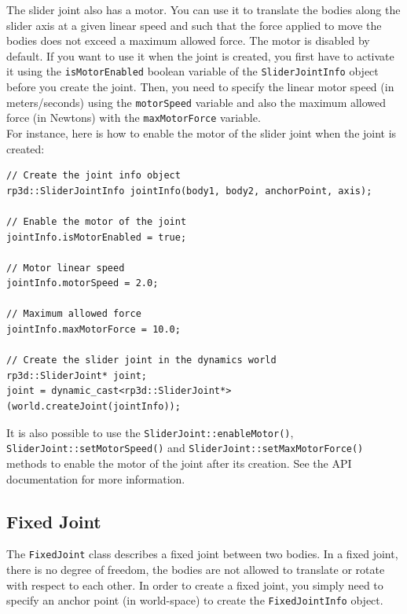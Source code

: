 \documentclass[a4paper,12pt]{article}
\begin{document}
     The slider joint also has a motor. You can use it to translate the bodies along the slider axis at a given linear speed and such that the force applied to
     move the bodies does not exceed a maximum allowed force. The motor is disabled by default. If you want to use it when the joint is created, you first have to activate it using the
     \texttt{isMotorEnabled} boolean variable of the \texttt{SliderJointInfo} object before you create the joint. Then, you need to specify the linear motor speed (in meters/seconds)
     using the \texttt{motorSpeed} variable and also the maximum allowed force (in Newtons) with the \texttt{maxMotorForce} variable. \\

     For instance, here is how to enable the motor of the slider joint when the joint is created: \\

     \begin{lstlisting}
// Create the joint info object
rp3d::SliderJointInfo jointInfo(body1, body2, anchorPoint, axis);

// Enable the motor of the joint
jointInfo.isMotorEnabled = true;

// Motor linear speed
jointInfo.motorSpeed = 2.0;

// Maximum allowed force
jointInfo.maxMotorForce = 10.0;

// Create the slider joint in the dynamics world
rp3d::SliderJoint* joint;
joint = dynamic_cast<rp3d::SliderJoint*>(world.createJoint(jointInfo));
  \end{lstlisting}

     \vspace{0.6cm}

     \begin{sloppypar}
        It is also possible to use the \texttt{SliderJoint::enableMotor()}, \texttt{SliderJoint::setMotorSpeed()} and \texttt{SliderJoint::setMaxMotorForce()} methods to enable the
        motor of the joint after its creation. See the API documentation for more information.
     \end{sloppypar}

    \subsection{Fixed Joint}

    The \texttt{FixedJoint} class describes a fixed joint between two bodies. In a fixed joint, there is no degree of freedom, the bodies are not allowed to translate
    or rotate with respect to each other. In order to create a fixed joint, you simply need to specify an anchor point (in world-space) to create the \texttt{FixedJointInfo}
    object. \\
\end{document}

